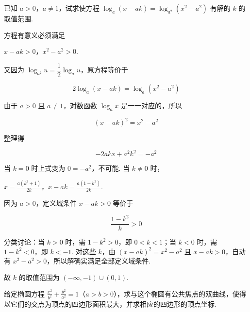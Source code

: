 \begin{problem}
已知 \(a > 0\)，\(a \neq 1\)，试求使方程 \(\log_a(x - ak) = \log_{a^2}(x^2 - a^2)\) 有解的 \(k\) 的取值范围.
\end{problem}

\begin{solution}
方程有意义必须满足

\(x-ak>0\)，\(x^2-a^2>0\).

又因为 \(\log_{a^2}u=\dfrac12\log_a u\)，原方程等价于

\[2\log_a(x-ak)=\log_a(x^2-a^2)\]

由于 \(a>0\) 且 \(a\neq1\)，对数函数 \(\log_a x\) 是一一对应的，所以

\[(x-ak)^2=x^2-a^2\]

整理得

\[-2akx+a^2k^2=-a^2\]

当 \(k=0\) 时上式变为 \(0=-a^2\)，不可能. 当 \(k\neq0\) 时，

\(x=\frac{a(k^2+1)}{2k}\)，\(x-ak=\frac{a(1-k^2)}{2k}\).

因为 \(a>0\)，定义域条件 \(x-ak>0\) 等价于

\[\frac{1-k^2}{k}>0\]

分类讨论：当 \(k>0\) 时，需 \(1-k^2>0\)，即 \(0<k<1\)；当 \(k<0\) 时，需 \(1-k^2<0\)，即 \(k<-1\). 对这些 \(k\)，由 \((x-ak)^2=x^2-a^2\) 且 \(x-ak>0\)，自动有 \(x^2-a^2>0\)，所以解确实满足全部定义域条件.

故 \(k\) 的取值范围为 \(\left(-\infty,-1\right)\cup\left(0,1\right)\).
\end{solution}

\begin{problem}
给定椭圆方程 \(\frac{x^2}{b^2} + \frac{y^2}{a^2} = 1\)（\(a > b > 0\)），求与这个椭圆有公共焦点的双曲线，使得以它们的交点为顶点的四边形面积最大，并求相应的四边形的顶点坐标.
\end{problem}

